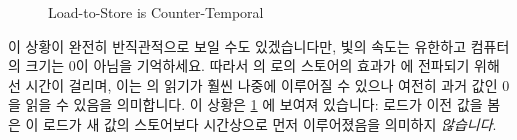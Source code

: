 \QuickQuizLabel{\MemorderQQLitmusTestR}

\begin{figure}[tbp]
\centering
{}
\caption{Load-to-Store is Counter-Temporal}
\label{fig:memorder:Load-to-Store is Counter-Temporal}
\end{figure}

이 상황이 완전히 반직관적으로 보일 수도 있겠습니다만, 빛의 속도는 유한하고
컴퓨터의 크기는 0이 아님을 기억하세요.
따라서  의  로의 스토어의 효과가  에 전파되기 위해선
시간이 걸리며, 이는  의  읽기가 훨씬 나중에 이루어질 수 있으나
여전히 과거 값인 0을 읽을 수 있음을 의미합니다.
이 상황은
\cref{fig:memorder:Load-to-Store is Counter-Temporal} 에 보여져 있습니다:
로드가 이전 값을 봄은 이 로드가 새 값의 스토어보다 시간상으로 먼저 이루어졌음을
의미하지 \emph{않습니다}.

